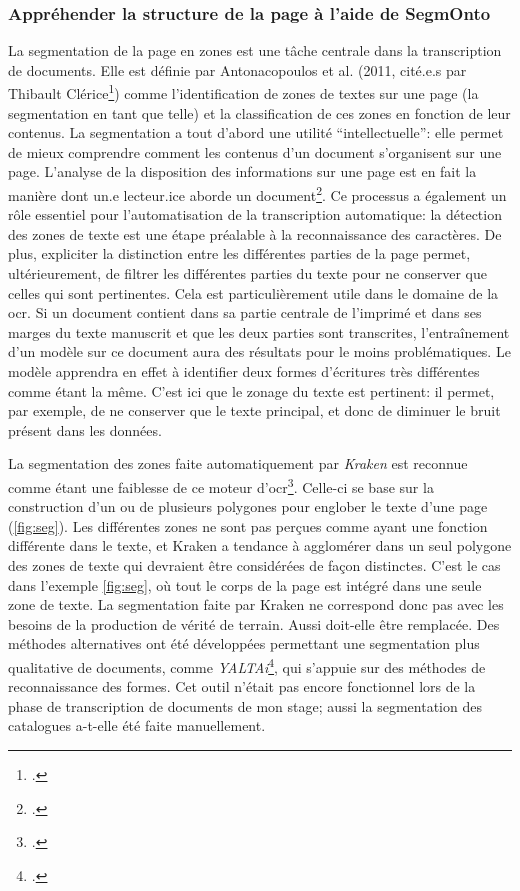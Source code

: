 \subsubsection{Appréhender la structure de la page à l'aide de SegmOnto}
La segmentation de la page en zones est une tâche centrale dans la transcription de documents. Elle est définie par Antonacopoulos et al. (2011, cité.e.s par Thibault Clérice\footcite[p. 4]{clerice_you_2022}) comme l'identification de zones de textes sur une page (la segmentation en tant que telle) et la classification de ces zones en fonction de leur contenus. La segmentation a tout d'abord une utilité \enquote{intellectuelle}: elle permet de mieux comprendre comment les contenus d'un document s'organisent sur une page. L'analyse de la disposition des informations sur une page est en fait la manière dont un.e lecteur.ice aborde un document\footcite{christensen_segmonto_2022}. Ce processus a également un rôle essentiel pour l'automatisation de la transcription automatique: la détection des zones de texte est une étape préalable à la reconnaissance des caractères. De plus, expliciter la distinction entre les différentes parties de la page permet, ultérieurement, de filtrer les différentes parties du texte pour ne conserver que celles qui sont pertinentes. Cela est particulièrement utile dans le domaine de la \gls{ocr}. Si un document contient dans sa partie centrale de l'imprimé et dans ses marges du texte manuscrit et que les deux parties sont transcrites, l'entraînement d'un modèle sur ce document aura des résultats pour le moins problématiques. Le modèle apprendra en effet à identifier deux formes d'écritures très différentes comme étant la même. C'est ici que le zonage du texte est pertinent: il permet, par exemple, de ne conserver que le texte principal, et donc de diminuer le bruit présent dans les données.

La segmentation des zones faite automatiquement par \textit{Kraken} est reconnue comme étant une faiblesse de ce moteur d'\gls{ocr}\footcite[p. 1]{clerice_you_2022}. Celle-ci se base sur la construction d'un ou de plusieurs polygones pour englober le texte d'une page (\ref{fig:seg}). Les différentes zones ne sont pas perçues comme ayant une fonction différente dans le texte, et Kraken a tendance à agglomérer dans un seul polygone des zones de texte qui devraient être considérées de façon distinctes. C'est le cas dans l'exemple \ref{fig:seg}, où tout le corps de la page est intégré dans une seule zone de texte. La segmentation faite par Kraken ne correspond donc pas avec les besoins de la production de vérité de terrain. Aussi doit-elle être remplacée. Des méthodes alternatives ont été développées permettant une segmentation plus qualitative de documents, comme \textit{YALTAi}\footcite{clerice_you_2022}, qui s'appuie sur des méthodes de reconnaissance des formes. Cet outil n'était pas encore fonctionnel lors de la phase de transcription de documents de mon stage; aussi la segmentation des catalogues a-t-elle été faite manuellement.

